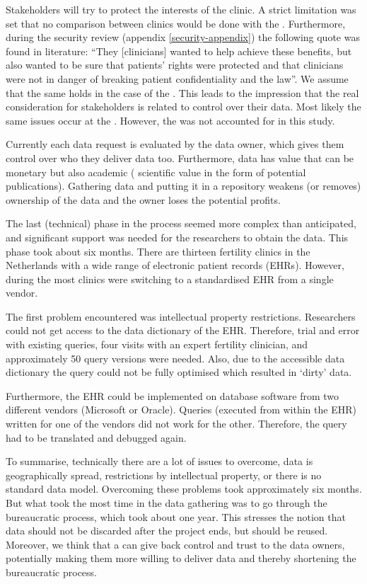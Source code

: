 Stakeholders will try to protect the interests of the clinic.
A strict limitation was set that no comparison between clinics would be done with the \projectdata{}.
Furthermore, during the security review (appendix \ref{security-appendix}) the following quote was found in literature: ``They [clinicians] wanted to help achieve these benefits, but also wanted to be sure that patients' rights were protected and that clinicians were not in danger of breaking patient confidentiality and the law''.
We assume that the same holds in the case of the \project{}.
This leads to the impression that the real consideration for stakeholders is related to control over their data.
Most likely the same issues occur at the \PRN{}.
However, the \PRN{} was not accounted for in this study.

Currently each data request is evaluated by the data owner, which gives them control over who they deliver data too.
Furthermore, data has value that can be monetary but also academic (\ie{} scientific value in the form of potential publications).
Gathering data and putting it in a repository weakens (or removes) ownership of the data and the owner loses the potential profits.

The last (technical) phase in the process seemed more complex than anticipated, and significant support was needed for the \project{} researchers to obtain the data.
This phase took about six months.
There are thirteen fertility clinics in the Netherlands with a wide range of electronic patient records (EHRs).
However, during the \project{} most clinics were switching to a standardised EHR from a single vendor.

The first problem encountered was intellectual property restrictions.
Researchers could not get access to the data dictionary of the EHR.
Therefore, trial and error with existing queries, four visits with an expert fertility clinician, and approximately 50 query versions were needed.
Also, due to the accessible data dictionary the query could not be fully optimised which resulted in `dirty' data.

Furthermore, the EHR could be implemented on database software from two different vendors (Microsoft or Oracle).
Queries (executed from within the EHR) written for one of the vendors did not work for the other.
Therefore, the query had to be translated and debugged again.

To summarise, technically there are a lot of issues to overcome, \eg{} data is geographically spread, restrictions by intellectual property, or there is no standard data model.
Overcoming these problems took approximately six months.
But what took the most time in the \project{} data gathering was to go through the bureaucratic process, which took about one year.
This stresses the notion that data should not be discarded after the project ends, but should be reused.
Moreover, we think that a \ivfsystem{} can give back control and trust to the data owners,
potentially making them more willing to deliver data and thereby shortening the bureaucratic process.


